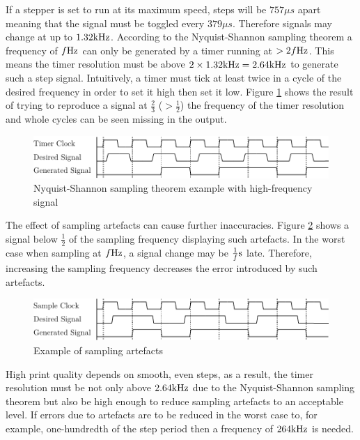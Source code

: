 				If a stepper is set to run at its maximum speed, steps will be
				$757\mu{}s$ apart meaning that the signal must be toggled every
				$379\mu{}s$.  Therefore signals may change at up to $1.32\textrm{kHz}$.
				According to the Nyquist-Shannon sampling theorem a frequency of $f\textrm{Hz}$
				can only be generated by a timer running at $> 2f\textrm{Hz}$. This means the
				timer resolution must be above $2 \times 1.32\textrm{kHz} = 2.64\textrm{kHz}$ to
				generate such a step signal\cite{shannon}. Intuitively, a timer must
				tick at least twice in a cycle of the desired frequency in order to set
				it high then set it low. Figure \ref{fig:nyquist} shows the result of
				trying to reproduce a signal at $\frac{2}{3}$ ($> \frac{1}{2}$) the
				frequency of the timer resolution and whole cycles can be seen missing
				in the output.
				
				\begin{figure}
					\includegraphics[width=1\textwidth]{diagrams/nyquist.pdf}
					\caption{Nyquist-Shannon sampling theorem example with high-frequency
					signal}
					\label{fig:nyquist}
				\end{figure}
				
				The effect of sampling artefacts can cause further inaccuracies. Figure
				\ref{fig:artefacts} shows a signal below $\frac{1}{2}$ of the sampling
				frequency displaying such artefacts. In the worst case when sampling at
				$f\textrm{Hz}$, a signal change may be $\frac{1}{f}\textrm{s}$ late. Therefore,
				increasing the sampling frequency decreases the error introduced by such
				artefacts.
				
				\begin{figure}
					\includegraphics[width=1\textwidth]{diagrams/artefacts.pdf}
					\caption{Example of sampling artefacts}
					\label{fig:artefacts}
				\end{figure}
				
				High print quality depends on smooth, even steps, as a result, the timer
				resolution must be not only above $2.64\textrm{kHz}$ due to the Nyquist-Shannon
				sampling theorem but also be high enough to reduce sampling artefacts to
				an acceptable level. If errors due to artefacts are to be reduced in the
				worst case to, for example, one-hundredth of the step period then a
				frequency of $264\textrm{kHz}$ is needed.
				
